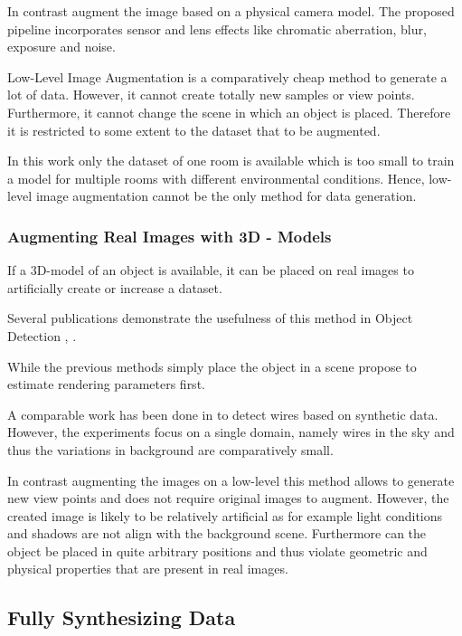 In contrast \citeauthor{Carlson2018}\cite{Carlson2018} augment the image based on a physical camera model. The proposed pipeline incorporates sensor and lens effects like chromatic aberration, blur, exposure and noise.

Low-Level Image Augmentation is a comparatively cheap method to generate a lot of data. However, it cannot create totally new samples or view points. Furthermore, it cannot change the scene in which an object is placed. Therefore it is restricted to some extent to the dataset that to be augmented.

In this work only the dataset of one room is available which is too small to train a model for multiple rooms with different environmental conditions. Hence, low-level image augmentation cannot be the only method for data generation.

\subsubsection{Augmenting Real Images with 3D - Models}

If a 3D-model of an object is available, it can be placed on real images to artificially create or increase a dataset. 

Several publications demonstrate the usefulness of this method in Object Detection \cite{Girshick2013}, \cite{Peng}.

While the previous methods simply place the object in a scene \citeauthor{Rozantsev} \cite{Rozantsev} propose to estimate rendering parameters first.

A comparable work has been done in \cite{Madaan2017} to detect wires based on synthetic data. However, the experiments focus on a single domain, namely wires in the sky and thus the variations in background are comparatively small.

In contrast augmenting the images on a low-level this method allows to generate new view points and does not require original images to augment. However, the created image is likely to be relatively artificial as for example light conditions and shadows are not align with the background scene. Furthermore can the object be placed in quite arbitrary positions and thus violate geometric and physical properties that are present in real images. 


\subsection{Fully Synthesizing Data}

